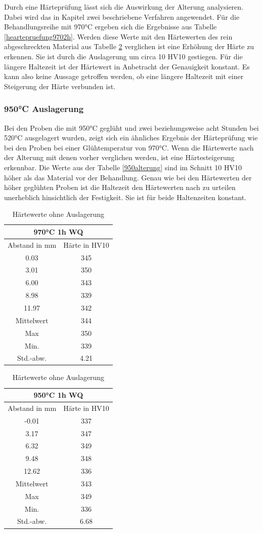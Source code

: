 \documentclass[a4paper, 11pt]{tubsreprt}
\begin{document}
Durch eine Härteprüfung lässt sich die Auswirkung der Alterung analysieren. Dabei wird das in Kapitel zwei beschriebene Verfahren angewendet. Für die Behandlungsreihe mit 970°C ergeben sich die Ergebnisse aus Tabelle \ref{heartepruefung9702h}. Werden diese Werte mit den Härtewerten des rein abgeschreckten Material aus Tabelle \ref{Hearte ohne Behandlung} verglichen ist eine Erhöhung der Härte zu erkennen. Sie ist durch die Auslagerung um circa 10 HV10 gestiegen. Für die längere Haltezeit ist der Härtewert in Anbetracht der Genauigkeit konstant. Es kann also keine Aussage getroffen werden, ob eine längere Haltezeit mit einer Steigerung der Härte verbunden ist. 

\subsubsection{950°C Auslagerung}
Bei den Proben die mit 950°C geglüht und zwei beziehungsweise acht Stunden bei 520°C ausgelagert wurden, zeigt sich ein ähnliches Ergebnis der Härteprüfung wie bei den Proben bei einer Glühtemperatur von 970°C. Wenn die Härtewerte nach der Alterung mit denen vorher verglichen werden, ist eine Härtesteigerung erkennbar. Die Werte aus der Tabelle \ref{950alterung} sind im Schnitt 10 HV10 höher als das Material vor der Behandlung. Genau wie bei den Härtewerten der höher geglühten Proben ist die Haltezeit den Härtewerten nach zu urteilen  unerheblich hinsichtlich der Festigkeit. Sie ist für beide Haltenzeiten konstant.
\begin{table}[t]	%
\begin{tabular}{c|c}
\multicolumn{2}{c}{970°C 1h WQ} \\
\hline 
Abstand in mm	& Härte in HV10 \\
0.03	& 345\\
3.01	& 350\\
6.00	& 343\\
8.98	& 339 \\
11.97	& 342\\
\hline
Mittelwert	& 344 \\
Max	& 350 \\
Min.	& 339 \\
Std.-abw. &	4.21 \\

\end{tabular}
\begin{tabular}{c|c}
\multicolumn{2}{c}{950°C 1h WQ} \\
\hline 	
Abstand in mm	& 	Härte in HV10 \\
-0.01	&	337 \\
3.17	&	347 \\
6.32	&	349 \\
9.48	&	348 \\ 
12.62	&	336 \\
\hline
Mittelwert &	343 \\
Max	&	349 \\
Min.	&	336 \\
Std.-abw.	&	6.68 \\

\end{tabular}
\caption{Härtewerte ohne Auslagerung}
\label{Hearte ohne Behandlung}
\end{table}
\end{document}
